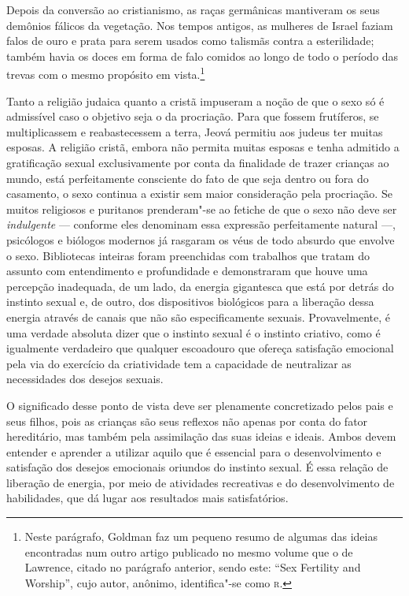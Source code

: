 Depois da conversão ao cristianismo, as raças germânicas mantiveram %
os seus demônios fálicos da vegetação. Nos tempos antigos, as mulheres
de Israel faziam falos de ouro e prata para serem usados como talismãs
contra a esterilidade; também havia os doces em forma de falo
comidos ao longo de todo o período das trevas com o mesmo propósito em
vista.\footnote{Neste parágrafo, Goldman faz um pequeno resumo de
  algumas das ideias encontradas num outro artigo publicado no mesmo
  volume que o de Lawrence, citado no parágrafo anterior, sendo este:
  ``Sex Fertility and Worship'', cujo autor, anônimo, identifica"-se como
  \textsc{r}.}

Tanto a religião judaica quanto a cristã impuseram a noção de que o
sexo só é admissível caso o objetivo seja o da procriação. Para que fossem
frutíferos, se multiplicassem e reabastecessem a terra, Jeová permitiu
aos judeus ter muitas esposas. A religião cristã, embora não permita
muitas esposas e tenha admitido a gratificação sexual exclusivamente por conta da
finalidade de trazer crianças ao mundo, está perfeitamente consciente do
fato de que seja dentro ou fora do casamento, o sexo continua a existir
sem maior consideração pela procriação. Se muitos religiosos e
puritanos prenderam"-se ao fetiche de que o sexo não deve ser \textit{indulgente}
--- conforme eles denominam essa expressão perfeitamente natural ---,
psicólogos e biólogos modernos já rasgaram os véus de todo absurdo que
envolve o sexo. Bibliotecas inteiras foram preenchidas com trabalhos que
tratam do assunto com entendimento e profundidade e demonstraram que
houve uma percepção inadequada, de um lado, da energia gigantesca que
está por detrás do instinto sexual e, de outro, dos dispositivos
biológicos para a liberação dessa energia através de canais que não são
especificamente sexuais. Provavelmente, é uma verdade absoluta dizer que
o instinto sexual é o instinto criativo, como é igualmente verdadeiro
que qualquer escoadouro que ofereça satisfação emocional pela via do
exercício da criatividade tem a capacidade de neutralizar as
necessidades dos desejos sexuais.

O significado desse ponto de vista deve ser plenamente concretizado
pelos pais e seus filhos, pois as crianças são seus reflexos não apenas
por conta do fator hereditário, mas também pela assimilação das suas
ideias e ideais. Ambos devem entender e aprender a utilizar aquilo que é
essencial para o desenvolvimento e satisfação dos desejos emocionais oriundos
do instinto sexual. É essa relação de liberação de energia, por meio
de atividades recreativas e do desenvolvimento de habilidades, que dá lugar
aos resultados mais satisfatórios.


